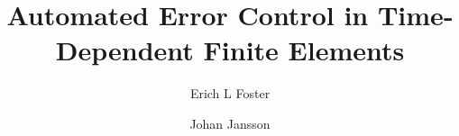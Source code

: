 \documentclass[a4paper]{elsarticle}
\begin{document}
  \begin{frontmatter}
    \author[1]{Erich L Foster}

    \author[1]{Johan Jansson}

    \address[1]{Basque Center for Applied Mathematics, Alameda Mazarredo, 14,
      48009 Bilbao, Basque Country -- Spain}

    \title{Automated Error Control in Time-Dependent Finite Elements}

    \begin{abstract}

    \end{abstract}
  \end{frontmatter}

  \printbibliography
\end{document}
